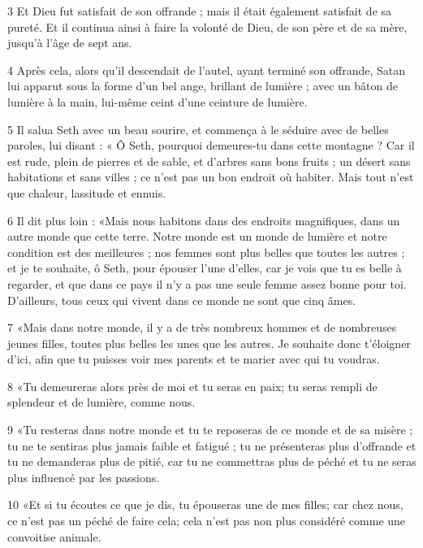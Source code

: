 \par 3 Et Dieu fut satisfait de son offrande ; mais il était également satisfait de sa pureté. Et il continua ainsi à faire la volonté de Dieu, de son père et de sa mère, jusqu'à l'âge de sept ans.

\par 4 Après cela, alors qu'il descendait de l'autel, ayant terminé son offrande, Satan lui apparut sous la forme d'un bel ange, brillant de lumière ; avec un bâton de lumière à la main, lui-même ceint d'une ceinture de lumière.

\par 5 Il salua Seth avec un beau sourire, et commença à le séduire avec de belles paroles, lui disant : « Ô Seth, pourquoi demeures-tu dans cette montagne ? Car il est rude, plein de pierres et de sable, et d'arbres sans bons fruits ; un désert sans habitations et sans villes ; ce n’est pas un bon endroit où habiter. Mais tout n’est que chaleur, lassitude et ennuis.

\par 6 Il dit plus loin : «Mais nous habitons dans des endroits magnifiques, dans un autre monde que cette terre. Notre monde est un monde de lumière et notre condition est des meilleures ; nos femmes sont plus belles que toutes les autres ; et je te souhaite, ô Seth, pour épouser l'une d'elles, car je vois que tu es belle à regarder, et que dans ce pays il n'y a pas une seule femme assez bonne pour toi. D'ailleurs, tous ceux qui vivent dans ce monde ne sont que cinq âmes.

\par 7 «Mais dans notre monde, il y a de très nombreux hommes et de nombreuses jeunes filles, toutes plus belles les unes que les autres. Je souhaite donc t'éloigner d'ici, afin que tu puisses voir mes parents et te marier avec qui tu voudras.

\par 8 «Tu demeureras alors près de moi et tu seras en paix; tu seras rempli de splendeur et de lumière, comme nous.

\par 9 «Tu resteras dans notre monde et tu te reposeras de ce monde et de sa misère ; tu ne te sentiras plus jamais faible et fatigué ; tu ne présenteras plus d'offrande et tu ne demanderas plus de pitié, car tu ne commettras plus de péché et tu ne seras plus influencé par les passions.

\par 10 «Et si tu écoutes ce que je dis, tu épouseras une de mes filles; car chez nous, ce n'est pas un péché de faire cela; cela n'est pas non plus considéré comme une convoitise animale.

